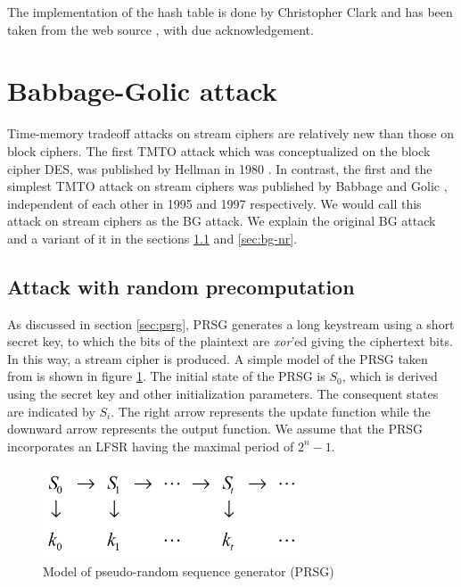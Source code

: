 The implementation of the hash table is done by Christopher Clark and has been taken from the web source \cite{hash-table-impl}, with due acknowledgement. 



\section{Babbage-Golic attack}
\label{sec:bg-attack}
Time-memory tradeoff attacks on stream ciphers are relatively new than those on block ciphers. The first TMTO attack which was conceptualized on the block cipher DES, was published by Hellman in 1980 \cite{hellman1980ctm}. In contrast, the first and the simplest TMTO attack on stream ciphers was published by Babbage \cite{babbage} and Golic \cite{golic}, independent of each other in 1995 and 1997 respectively. We would call this attack on stream ciphers as the BG attack. We explain the original BG attack and a variant of it in the sections \ref{sec:bg-r} and \ref{sec:bg-nr}.

\subsection{Attack with random precomputation}
\label{sec:bg-r}

As discussed in section \ref{sec:psrg}, PRSG generates a long keystream using a short secret key, to which the bits of the plaintext are \emph{xor}'ed giving the ciphertext bits. In this way, a stream cipher is produced. A simple model of the PRSG taken from \cite{babbage} is shown in figure \ref{fig:psrg-model}. The initial state of the PRSG is $S_0$, which is derived using the secret key and other initialization parameters. The consequent states are indicated by $S_i$. The right arrow represents the update function while the downward arrow represents the output function. We assume that the PRSG incorporates an LFSR having the maximal period of $2^{n} - 1$.

\begin{figure}[h]
	\centering
	\includegraphics[width=3in]{./figures/prsgmodel.png}
	\caption{Model of pseudo-random sequence generator (PRSG)}	
	\label{fig:psrg-model}
\end{figure}

